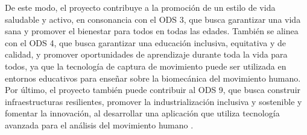 De este modo, el proyecto contribuye a la promoción de un estilo de vida saludable y activo, en consonancia con el \ac{ODS} 3, que busca garantizar una vida sana y promover el bienestar para todos en todas las edades. También se alinea con el \ac{ODS} 4, que busca garantizar una educación inclusiva, equitativa y de calidad, y promover oportunidades de aprendizaje durante toda la vida para todos, ya que la tecnología de captura de movimiento puede ser utilizada en entornos educativos para enseñar sobre la biomecánica del movimiento humano. Por último, el proyecto también puede contribuir al \ac{ODS} 9, que busca construir infraestructuras resilientes, promover la industrialización inclusiva y sostenible y fomentar la innovación, al desarrollar una aplicación que utiliza tecnología avanzada para el análisis del movimiento humano \autocite{ODSObjetivosDesarrollo}.

